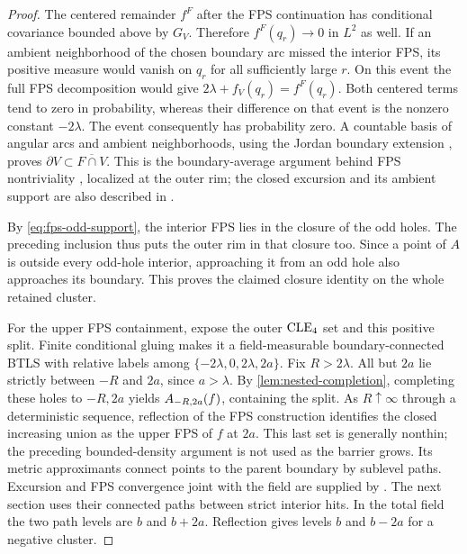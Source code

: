 \begin{proof}
The centered remainder \(f^F\) after the FPS continuation has
conditional covariance bounded above by $G_V$. Therefore
\(f^F(q_r)\to0\) in \(L^2\) as well. If an ambient neighborhood of
the chosen boundary arc missed the interior FPS, its positive measure
would vanish on $q_r$ for all sufficiently large $r$. On this event
the full FPS decomposition would give
\(2\lambda+f_V(q_r)=f^F(q_r)\).
Both centered terms tend to zero in probability, whereas their
difference on that event is the nonzero constant $-2\lambda$.
The event consequently has probability zero. A countable basis of
angular arcs and ambient neighborhoods, using the Jordan boundary
extension \cite[Chapter~I, Theorem~3.1]{GarnettMarshall2005}, proves
\(\partial V\subset\overline{F\cap V}\).
This is the boundary-average argument behind FPS nontriviality
\cite[Proposition~4.6]{ALS2017}, localized at the outer rim;
the closed excursion and its ambient support are also described in
\cite[Theorem~1 and Section~3]{ALS2023}.

By \cref{eq:fps-odd-support}, the interior FPS lies in the closure
of the odd holes. The preceding inclusion thus puts the outer rim
in that closure too. Since a point of $A$ is outside every odd-hole
interior, approaching it from an odd hole also approaches its
boundary. This proves the claimed closure identity on the whole
retained cluster.

For the upper FPS containment, expose the outer \(\mathrm{CLE}_4\) set and
this positive split. Finite conditional gluing makes it a
field-measurable boundary-connected BTLS with relative labels among
\(\{-2\lambda,0,2\lambda,2a\}\). Fix \(R>2\lambda\).
All but \(2a\) lie strictly between \(-R\) and \(2a\), since
\(a>\lambda\). By \cref{lem:nested-completion}, completing these
holes to \(-R,2a\) yields \(A_{-R,2a}(f)\), containing the split.
As \(R\uparrow\infty\) through a deterministic sequence, reflection of
the FPS construction
\cite[Remark~4.2 and Proposition~4.4]{ALS2017} identifies the closed
increasing union as the upper FPS of \(f\) at \(2a\). This last set
is generally nonthin; the preceding bounded-density argument is not
used as the barrier grows. Its metric approximants connect points to
the parent boundary by sublevel paths. Excursion and FPS convergence
joint with the field are supplied by \cite{ALS2018,ALS2023}.
The next section uses their connected paths between strict interior
hits. In the total field the two path levels are \(b\) and \(b+2a\).
Reflection gives levels \(b\) and \(b-2a\) for a negative cluster.


\end{proof}

